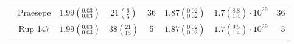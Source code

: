\begin{tabular}{lccccccr}
          & Praesepe &  $1.99\left(^{0.03}_{0.03}\right)$ &          $21\left(^{6}_{5}\right)$ &             36 &  $1.87\left(^{0.02}_{0.02}\right)$ &   $1.7\left(^{8.8}_{1.4}\right)\cdot 10^{29}$ &               36 \\
          & Rup 147 &  $1.99\left(^{0.03}_{0.03}\right)$ &        $38\left(^{21}_{15}\right)$ &              5 &  $1.87\left(^{0.02}_{0.02}\right)$ &   $1.7\left(^{9.5}_{1.4}\right)\cdot 10^{29}$ &                5 \\
\hline

\end{tabular}
